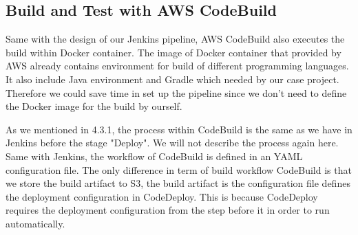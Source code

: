 \subsection{Build and Test with AWS CodeBuild}
Same with the design of our Jenkins pipeline, AWS CodeBuild also executes the build within Docker container. The image of Docker container that provided by AWS already contains environment for build of different programming languages. It also include Java environment and Gradle which needed by our case project. Therefore we could save time in set up the pipeline since we don't need to define the Docker image for the build by ourself.
\par
As we mentioned in 4.3.1, the process within CodeBuild is the same as we have in Jenkins before the stage "Deploy". We will not describe the process again here. Same with Jenkins, the workflow of CodeBuild is defined in an YAML configuration file. The only difference in term of build workflow CodeBuild is that we store the build artifact to S3, the build artifact is the configuration file defines the deployment configuration in CodeDeploy. This is because CodeDeploy requires the deployment configuration from the step before it in order to run automatically.
